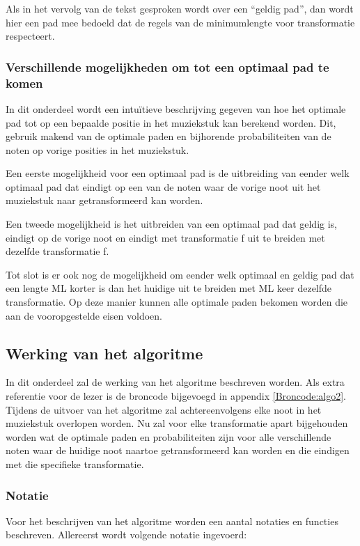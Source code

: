 Als in het vervolg van de tekst gesproken wordt over een ``geldig pad'', dan wordt hier een pad mee bedoeld dat de regels van de minimumlengte voor transformatie respecteert.

\subsubsection{Verschillende mogelijkheden om tot een optimaal pad te komen} 
In dit onderdeel wordt een intu\"itieve beschrijving gegeven van hoe het optimale pad tot op een bepaalde positie in het muziekstuk kan berekend worden. Dit, gebruik makend van de optimale paden en bijhorende probabiliteiten van de noten op vorige posities in het muziekstuk.

Een eerste mogelijkheid voor een optimaal pad is de uitbreiding van eender welk optimaal pad dat eindigt op een van de noten waar de vorige noot uit het muziekstuk naar getransformeerd kan worden.
 
Een tweede mogelijkheid is het uitbreiden van een optimaal pad dat geldig is, eindigt op de vorige noot en eindigt met transformatie f uit te breiden met dezelfde transformatie f.
 
Tot slot is er ook nog de mogelijkheid om eender welk optimaal en geldig pad dat een lengte ML korter is dan het huidige uit te breiden met ML keer dezelfde transformatie. Op deze manier kunnen alle optimale paden bekomen worden die aan de vooropgestelde eisen voldoen.

\subsection{Werking van het algoritme}
In dit onderdeel zal de werking van het algoritme beschreven worden. Als extra referentie voor de lezer is de broncode bijgevoegd in appendix \ref{Broncode:algo2}. Tijdens de uitvoer van het algoritme zal achtereenvolgens elke noot in het muziekstuk overlopen worden. Nu zal voor elke transformatie apart bijgehouden worden wat de optimale paden en probabiliteiten zijn voor alle verschillende noten waar de huidige noot naartoe getransformeerd kan worden en die eindigen met die specifieke transformatie. 

\subsubsection{Notatie}
Voor het beschrijven van het algoritme worden een aantal notaties en functies beschreven. Allereerst wordt volgende notatie ingevoerd:

